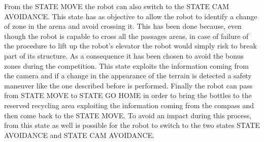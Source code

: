 From the STATE MOVE the robot can also switch to the STATE CAM AVOIDANCE.
This state has as objective to allow the robot to identify a change of zone in the arena and avoid crossing it.
This has been done because, even though the robot is capable to cross all the passages areas, in case of failure of the procedure to lift up the robot's elevator the robot would simply risk to break part of its structure. As a consequence it has been chosen to avoid the bonus zones during the competition.
This state exploits the information coming from the camera and if a change in the appearance of the terrain is detected a safety maneuver like the one described before is performed.
Finally the robot can pass from STATE MOVE to STATE GO HOME in order to bring the bottles to the reserved recycling area exploiting the information coming from the compass and then come back to the STATE MOVE.
To avoid an impact during this process, from this state as well is possible for the robot to switch to the two states STATE AVOIDANCE and STATE CAM AVOIDANCE.



